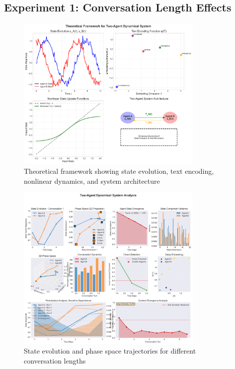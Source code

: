 \documentclass[11pt,a4paper]{article}
\begin{document}
\subsection{Experiment 1: Conversation Length Effects}

\begin{figure}[ht]
\centering
\includegraphics[width=0.8\textwidth]{final_visualizations/theoretical_framework.png}
\caption{Theoretical framework showing state evolution, text encoding, nonlinear dynamics, and system architecture}
\label{fig:theoretical}
\end{figure}

\begin{figure}[ht]
\centering
\includegraphics[width=0.8\textwidth]{final_visualizations/comprehensive_analysis.png}
\caption{State evolution and phase space trajectories for different conversation lengths}
\label{fig:comprehensive}
\end{figure}
\end{document}

